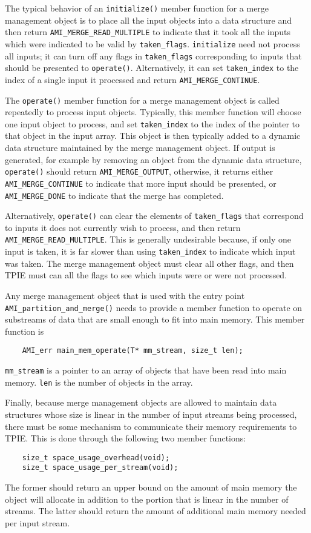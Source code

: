 The typical behavior of an \verb|initialize()| member function for a
merge management object is to place all the input objects into a data
structure and then return \verb|AMI_MERGE_READ_MULTIPLE| to indicate
that it took all the inputs which were indicated to be valid by
\verb|taken_flags|.  \verb|initialize| need not process all inputs; it
can turn off any flags in \verb|taken_flags| corresponding to inputs
that should be presented to \verb|operate()|.  Alternatively, it can
set \verb|taken_index| to the index of a single input it processed and
return \verb|AMI_MERGE_CONTINUE|.

The \verb|operate()| member function for a merge management object is
called repeatedly to process input objects.  Typically, this member
function will choose one input object to process, and set
\verb|taken_index| to the index of the pointer to that object in the
input array.  This object is then typically added to a dynamic data
structure maintained by the merge management object.  If output is
generated, for example by removing an object from the dynamic data
structure, \verb|operate()| should return \verb|AMI_MERGE_OUTPUT|,
otherwise, it returns either \verb|AMI_MERGE_CONTINUE| to indicate that
more input should be presented, or \verb|AMI_MERGE_DONE| to indicate
that the merge has completed.  

Alternatively, \verb|operate()| can clear the elements of
\verb|taken_flags| that correspond to inputs it does not currently
wish to process, and then return \verb|AMI_MERGE_READ_MULTIPLE|.  This
is generally undesirable because, if only one input is taken, it is
far slower than using \verb|taken_index| to indicate which input was
taken.  The merge management object must clear all other flags, and
then TPIE must can all the flags to see which inputs were or were not 
processed.

Any merge management object that is used with the entry point
\verb|AMI_partition_and_merge()| needs to provide a member function to
operate on substreams of data that are small enough to fit into main
memory.  This member function is
\begin{verbatim}
    AMI_err main_mem_operate(T* mm_stream, size_t len);
\end{verbatim}
\verb|mm_stream| is a pointer to an array of objects that have
been read into main memory.  \verb|len| is the number of objects in
the array.

Finally, because merge management objects are allowed to maintain data
structures whose size is linear in the number of input streams being
processed, there must be some mechanism to communicate their memory
requirements to TPIE.  This is done through the following two member
functions:
\begin{verbatim}
    size_t space_usage_overhead(void);
    size_t space_usage_per_stream(void);
\end{verbatim}
The former should return an upper bound on the amount of main memory
the object will allocate in addition to the portion that is linear in
the number of streams.  The latter should return the amount of
additional main memory needed per input stream.

